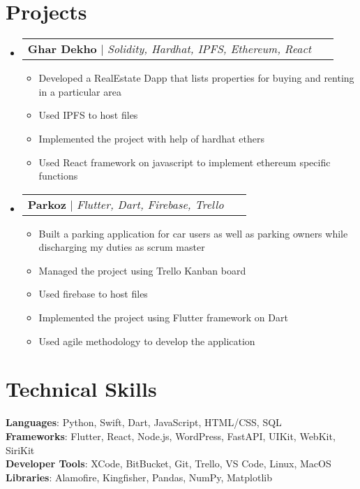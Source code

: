 \documentclass[letterpaper,11pt]{article}
\makeatletter
\newcommand{\resumeItem}[1]{
  \item\small{
    {#1 \vspace{-2pt}}
  }
}
\newcommand{\resumeProjectHeading}[2]{
    \item
    \begin{tabular*}{0.97\textwidth}{l@{\extracolsep{\fill}}r}
      \small#1 & #2 \\
    \end{tabular*}\vspace{-7pt}
}
\newcommand{\resumeSubHeadingListStart}{\begin{itemize}[leftmargin=0.15in, label={}]}
\newcommand{\resumeSubHeadingListEnd}{\end{itemize}}
\newcommand{\resumeItemListStart}{\begin{itemize}}
\newcommand{\resumeItemListEnd}{\end{itemize}\vspace{-5pt}}
\makeatother
\begin{document}
\section{Projects}
    \resumeSubHeadingListStart
      \resumeProjectHeading
          {\textbf{Ghar Dekho} $|$ \emph{Solidity, Hardhat, IPFS, Ethereum, React}}\
          \resumeItemListStart
            \resumeItem{Developed a RealEstate Dapp that lists properties for buying and renting in a particular area}
            \resumeItem{Used IPFS to host files}
            \resumeItem{Implemented the project with help of hardhat ethers}
            \resumeItem{Used React framework on javascript to implement ethereum specific functions}
          \resumeItemListEnd
      \resumeProjectHeading
          {\textbf{Parkoz} $|$ \emph{Flutter, Dart, Firebase, Trello}}\
          \resumeItemListStart
            \resumeItem{Built a parking application for car users as well as parking owners while discharging my duties as scrum master}
            \resumeItem{Managed the project using Trello Kanban board}
            \resumeItem{Used firebase to host files}
            \resumeItem{Implemented the project using Flutter framework on Dart}
            \resumeItem{Used agile methodology to develop the application}
          \resumeItemListEnd
    \resumeSubHeadingListEnd



%
\section{Technical Skills}
 \begin{itemize}[leftmargin=0.15in, label={}]
    \small{\item{
     \textbf{Languages}{: Python, Swift, Dart, JavaScript, HTML/CSS, SQL} \\
     \textbf{Frameworks}{: Flutter, React, Node.js,  WordPress, FastAPI, UIKit, WebKit, SiriKit} \\
     \textbf{Developer Tools}{: XCode, BitBucket, Git, Trello, VS Code, Linux, MacOS} \\
     \textbf{Libraries}{: Alamofire, Kingfisher, Pandas, NumPy, Matplotlib}
    }}
 \end{itemize}
\end{document}
